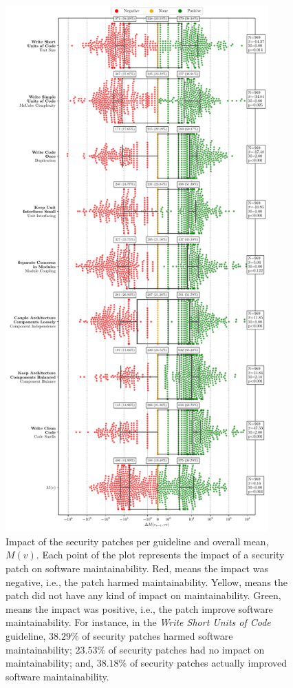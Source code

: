 \documentclass[smallextended]{svjour3}       %
\begin{document}
 \begin{figure}[htp]
     \begin{adjustwidth}{-1cm}{-1cm}  
  	\centering
  	\includegraphics[width=0.9\textwidth]{figures/main_per_guideline.pdf}
    \end{adjustwidth}
	
  	\caption{Impact of the security patches per guideline and overall mean, $M(v)$. 
	Each point of the plot represents the impact of a security patch on software 
	maintainability. Red, means the impact was negative, i.e., the patch 
	harmed maintainability. Yellow, means the patch did not have any 
	kind of impact on maintainability. Green, means the impact was 
	positive, i.e., the patch improve software maintainability. For instance, in the 
	\emph{Write Short Units of Code} guideline, $38.29\%$ of 
	security patches harmed software maintainability; $23.53\%$ of 
	security patches had no impact on maintainability; and, 
	$38.18\%$ of security patches actually improved software 
	maintainability.}
 	\label{fig:guidelines}	
 \end{figure}
 
\end{document}
